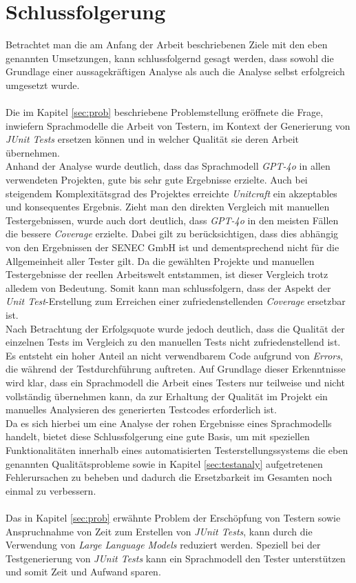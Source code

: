 \section{Schlussfolgerung}
Betrachtet man die am Anfang der Arbeit beschriebenen Ziele mit den eben genannten Umsetzungen, kann schlussfolgernd gesagt werden, dass sowohl die Grundlage einer aussagekräftigen Analyse als auch die Analyse selbst erfolgreich umgesetzt wurde.\\\\
Die im Kapitel \ref{sec:prob} beschriebene Problemstellung eröffnete die Frage, inwiefern Sprachmodelle die Arbeit von Testern, im Kontext der Generierung von \textit{JUnit Tests} ersetzen können und in welcher Qualität sie deren Arbeit übernehmen. \\Anhand der Analyse wurde deutlich, dass das Sprachmodell \textit{GPT-4o} in allen verwendeten Projekten, gute bis sehr gute Ergebnisse erzielte. Auch bei steigendem Komplexitätsgrad des Projektes erreichte \textit{Unitcraft} ein akzeptables und konsequentes Ergebnis. Zieht man den direkten Vergleich mit manuellen Testergebnissen, wurde auch dort deutlich, dass \textit{GPT-4o} in den meisten Fällen die bessere \textit{Coverage} erzielte. Dabei gilt zu berücksichtigen, dass dies abhängig von den Ergebnissen der SENEC GmbH ist und dementsprechend nicht für die Allgemeinheit aller Tester gilt. Da die gewählten Projekte und manuellen Testergebnisse der reellen Arbeitswelt entstammen, ist dieser Vergleich trotz alledem von Bedeutung. Somit kann man schlussfolgern, dass der Aspekt der \textit{Unit Test}-Erstellung zum Erreichen einer zufriedenstellenden \textit{Coverage} ersetzbar ist.\\ Nach Betrachtung der Erfolgsquote wurde jedoch deutlich, dass die Qualität der einzelnen Tests im Vergleich zu den manuellen Tests nicht zufriedenstellend ist. Es entsteht ein hoher Anteil an nicht verwendbarem Code aufgrund von \textit{Errors}, die während der Testdurchführung auftreten. Auf Grundlage dieser Erkenntnisse wird klar, dass ein Sprachmodell die Arbeit eines Testers nur teilweise und nicht vollständig übernehmen kann, da zur Erhaltung der Qualität im Projekt ein manuelles Analysieren des generierten Testcodes erforderlich ist. \\Da es sich hierbei um eine Analyse der rohen Ergebnisse eines Sprachmodells handelt, bietet diese Schlussfolgerung eine gute Basis, um mit speziellen Funktionalitäten innerhalb eines automatisierten Testerstellungssystems die eben genannten Qualitätsprobleme sowie in Kapitel \ref{sec:testanaly} aufgetretenen Fehlerursachen zu beheben und dadurch die Ersetzbarkeit im Gesamten noch einmal zu verbessern. \\\\Das in Kapitel \ref{sec:prob} erwähnte Problem der Erschöpfung von Testern sowie Anspruchnahme von Zeit zum Erstellen von \textit{JUnit Tests}, kann durch die Verwendung von \textit{Large Language Models} reduziert werden. Speziell bei der Testgenerierung von \textit{JUnit Tests} kann ein Sprachmodell den Tester unterstützen und somit Zeit und Aufwand sparen.

